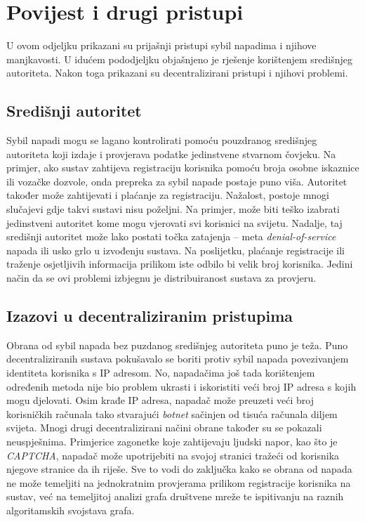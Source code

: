 \documentclass[times, utf8, seminar, numeric]{fer}
\begin{document}
\section{Povijest i drugi pristupi}
U ovom odjeljku prikazani su prijašnji pristupi sybil napadima i njihove manjkavosti. U idućem pododjeljku objašnjeno je rješenje korištenjem središnjeg autoriteta. Nakon toga prikazani su decentralizirani pristupi i njihovi problemi.

\subsection{Središnji autoritet}
Sybil napadi mogu se lagano kontrolirati pomoću pouzdranog središnjeg autoriteta koji izdaje i provjerava podatke jedinstvene stvarnom čovjeku. Na primjer, ako sustav zahtijeva registraciju korisnika pomoću broja osobne iskaznice ili vozačke dozvole, onda prepreka za sybil napade postaje puno viša. Autoritet također može zahtijevati i plaćanje za registraciju. Nažalost, postoje mnogi slučajevi gdje takvi sustavi nisu poželjni. Na primjer, može biti teško izabrati jedinstveni autoritet kome mogu vjerovati svi korisnici na svijetu. Nadalje, taj središnji autoritet može lako postati točka zatajenja  -- meta \textit{denial-of-service} napada ili usko grlo u izvođenju sustava. Na poslijetku, plaćanje registracije ili traženje osjetljivih informacija prilikom iste odbilo bi velik broj korisnika. Jedini način da se ovi problemi izbjegnu je distribuiranost sustava za provjeru. \cite{sybil-guard}

\subsection{Izazovi u decentraliziranim pristupima}
Obrana od sybil napada bez puzdanog središnjeg autoriteta puno je teža. Puno decentraliziranih sustava pokušavalo se boriti protiv sybil napada povezivanjem identiteta korisnika s IP adresom. No, napadačima još tada korištenjem određenih metoda nije bio problem ukrasti i iskoristiti veći broj IP adresa s kojih mogu djelovati. \cite{spammers} Osim krađe IP adresa, napadač može preuzeti veći broj korisničkih računala tako stvarajući \textit{botnet} sačinjen od tisuća računala diljem svijeta. Mnogi drugi decentralizirani načini obrane također su se pokazali neuspješnima. Primjerice zagonetke koje zahtijevaju ljudski napor, kao što je \textit{CAPTCHA}, napadač može upotrijebiti na svojoj stranici tražeći od korisnika njegove stranice da ih riješe. Sve to vodi do zaključka kako se obrana od napada ne može temeljiti na jednokratnim provjerama prilikom registracije korisnika na sustav, već na temeljitoj analizi grafa društvene mreže te ispitivanju na raznih algoritamskih svojstava grafa. \cite{sybil-guard}
\end{document}
